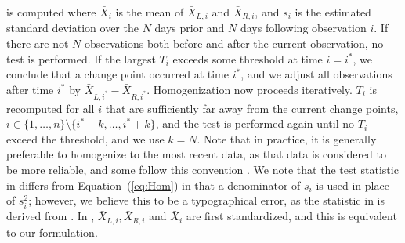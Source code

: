 \documentclass[12pt]{article}
\def\ni{\noindent}
\begin{document}
\begin{doublespacing}
\ni is computed where $\bar{X}_i$ is the mean of $\bar{X}_{L,i}$ and $\bar{X}_{R,i}$, and $s_i$ is the estimated standard deviation over the $N$ days prior and $N$ days following observation $i$.  If there are not $N$ observations both before and after the current observation, no test is performed.  If the largest $T_i$ exceeds some threshold at time $i=i^*$, we conclude that a change point occurred at time $i^*$, and we adjust all observations after time $i^*$ by $\bar{X}_{L,i^*}-\bar{X}_{R,i^*}$.  Homogenization now proceeds iteratively.  $T_i$ is recomputed for all $i$ that are sufficiently far away from the current change points, $i\in\{1,\ldots,n\} \setminus \{i^*-k, \ldots, i^*+k\}$, and the test is performed again until no $T_i$ exceed the threshold, and we use $k=N$.  Note that in practice, it is generally preferable to homogenize to the most recent data, as that data is considered to be more reliable, and some follow this convention \cite{domonkos13}. %
We note that the test statistic in \cite{haimberger07} differs from Equation~(\ref{eq:Hom}) in that a denominator of $s_i$ is used in place of $s_i^2$; however, we believe this to be a typographical error, as the statistic in \cite{haimberger07} is derived from \cite{alexandersson86}.  In \cite{alexandersson86}, $\bar{X}_{L,i}, \bar{X}_{R,i}$ and $\bar{X}_{i}$ are first standardized, and  this is equivalent to our formulation.



\end{doublespacing}
\end{document}
